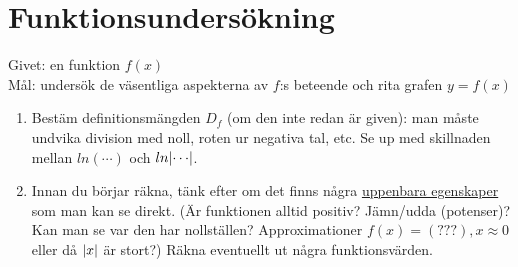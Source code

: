 \documentclass{article}
\begin{document}
\section{Funktionsundersökning}
Givet: en funktion $f(x)$\\
Mål: undersök de väsentliga aspekterna av $f$:s beteende och rita grafen $y=f(x)$\\

\begin{enumerate}
  \item Bestäm definitionsmängden $D_f$ (om den inte redan är given):
man måste undvika division med noll, roten ur negativa tal, etc.
Se up med skillnaden mellan $ln(\cdots)$ och $ln\lvert\cdots\rvert$.

  \item Innan du börjar räkna, tänk efter om det finns några \uline{uppenbara egenskaper}
    som man kan se direkt. (Är funktionen alltid positiv? Jämn/udda (potenser)?
    Kan man se var den har nollställen?
    Approximationer $f(x)=(???), x\approx0$ eller då $\lvert x\rvert$ är stort?)
    Räkna eventuellt ut några funktionsvärden.


\end{enumerate}
\end{document}
